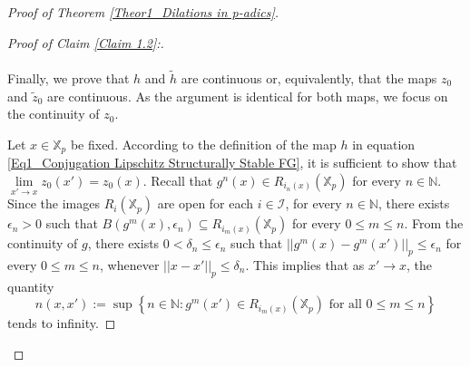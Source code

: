 \documentclass[a4paper, 12pt]{article}
\theoremstyle{definition}
\begin{document}
\begin{proof}[Proof of Theorem \ref{Theor1_Dilations in p-adics}]
\begin{proof}[Proof of Claim \ref{Claim 1.2}:]
			
			\paragraph{}
			Finally, we prove that $h$ and $\tilde{h}$ are continuous or, equivalently, that the maps $z_{0}$ and $\tilde{z}_{0}$ are continuous. As the argument is identical for both maps, we focus on the continuity of $z_{0}$. 
			
			
			Let $x \in \mathbb{X}_{p}$ be fixed. According to the definition of the map $h$ in equation \eqref{Eq1_Conjugation Lipschitz Structurally Stable FG}, it is sufficient to show that $\underset{x' \to x}{\lim} z_{0} \left(  x'  \right)  = z_{0} \left(  x  \right) $. 
			Recall that $g^{n} \left(  x  \right)  \in R_{i_{n} \left(  x  \right) } \left(  \mathbb{X}_{p}  \right) $ for every $n\in \mathbb{N} $. Since the images $R_{i} \left(  \mathbb{X}_{p}  \right) $ are open for each $i \in \mathcal{I}$, for every $n \in \mathbb{N} $, there exists $  \epsilon_{n}  > 0$ such that $B \left(  g^{m} \left(  x  \right) ,  \epsilon_{n}  \right)  \subseteq R_{i_{m} \left(  x  \right) } \left(  \mathbb{X}_{p}  \right) $ for every $0 \le m \le n$. From the continuity of $g$, there exists $0  < \delta_{n} \le  \epsilon_{n}$ such that $ \left| \left|  g^{m} \left(  x  \right)  - g^{m} \left(  x'  \right)   \right|  \right|_{p} \le  \epsilon_{n}$ for every $0 \le m \le n$, whenever $ \left| \left|  x - x'  \right|  \right|_{p} \le \delta_{n}$. This implies that as $x' \to x$, the quantity 
			$$ n \left(  x, x'  \right)   :=   \sup \left\{  n \in  \mathbb{N} :      g^{m} \left(  x' \right)  \in R_{i_{m}(x)} \left(  \mathbb{X}_{p}  \right)    \text{ for all }  0   \le   m    \le   n  \right\}   $$
			tends to infinity. 
			

\end{proof}
\end{proof}
\end{document}
